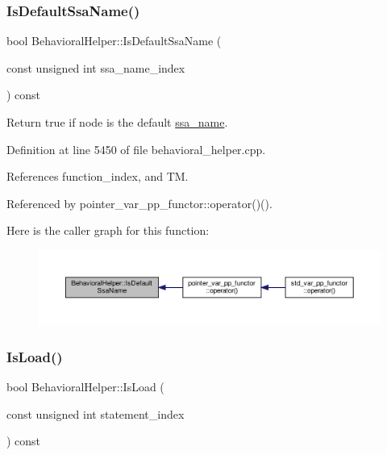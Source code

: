 \subsubsection{\texorpdfstring{Is\+Default\+Ssa\+Name()}{IsDefaultSsaName()}}
{\footnotesize\ttfamily bool Behavioral\+Helper\+::\+Is\+Default\+Ssa\+Name (\begin{DoxyParamCaption}\item[{const unsigned int}]{ssa\+\_\+name\+\_\+index }\end{DoxyParamCaption}) const}



Return true if node is the default \hyperlink{structssa__name}{ssa\+\_\+name}. 



Definition at line 5450 of file behavioral\+\_\+helper.\+cpp.



References function\+\_\+index, and TM.



Referenced by pointer\+\_\+var\+\_\+pp\+\_\+functor\+::operator()().

Here is the caller graph for this function\+:
\nopagebreak
\begin{figure}[H]
\begin{center}
\leavevmode
\includegraphics[width=350pt]{dd/db2/classBehavioralHelper_ab3cf7f144e14b8297d4f596ff8f54f90_icgraph}
\end{center}
\end{figure}
\mbox{\label{classBehavioralHelper_a39727c79473322e5994e5f5497c179ce}} 
\subsubsection{\texorpdfstring{Is\+Load()}{IsLoad()}}
{\footnotesize\ttfamily bool Behavioral\+Helper\+::\+Is\+Load (\begin{DoxyParamCaption}\item[{const unsigned int}]{statement\+\_\+index }\end{DoxyParamCaption}) const}



